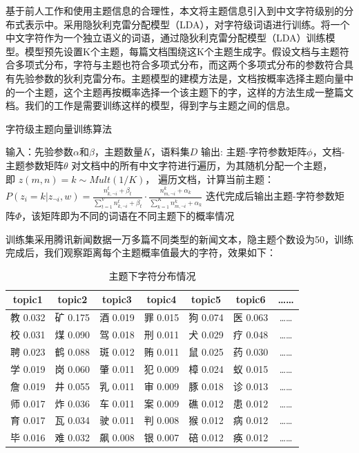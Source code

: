 \documentclass[winfonts,master,oneside,nobackinfo]{njuthesis}
\begin{document}
基于前人工作和使用主题信息的合理性，本文将主题信息引入到中文字符级别的分布式表示中。采用隐狄利克雷分配模型（LDA），对字符级词语进行训练。将一个中文字符作为一个独立语义的词语，通过隐狄利克雷分配模型（LDA）训练模型。模型预先设置K个主题，每篇文档围绕这K个主题生成字。假设文档与主题符合多项式分布，字符与主题也符合多项式分布，而这两个多项式分布的参数符合具有先验参数的狄利克雷分布。主题模型的建模方法是，文档按概率选择主题向量中的一个主题，这个主题再按概率选择一个该主题下的字，这样的方法生成一整篇文档。我们的工作是需要训练这样的模型，得到字与主题之间的信息。


\begin{algorithm}[H]
    \caption{字符级主题向量训练算法}
    \label{alg1}
    \begin{algorithmic}[1]
        \STATE 输入：先验参数$\alpha$和$\beta$，主题数量$K$，语料集$D$
        \STATE 输出: 主题-字符参数矩阵$\phi$，文档-主题参数矩阵$\theta$
        \STATE 对文档中的所有中文字符进行遍历，为其随机分配一个主题，\\即 $z(m,n)=k \sim Mult(1/K )$，  
        \STATE 遍历文档，计算当前主题：\\
        $P(z_i=k|z_{\neg i}, w) = \frac {n_{k, \neg i}^t + \beta_t} { \sum_{t=1}^{V} n_{k,\neg i}^t + \beta_t} \cdot \frac {n_{m,\neg i}^k + \alpha_k} {\sum_{k=1}^{K} n_{m, \neg i}^k + \alpha_k }$
        \STATE 迭代完成后输出主题-字符参数矩阵$\Phi$，该矩阵即为不同的词语在不同主题下的概率情况
    \end{algorithmic}
\end{algorithm}

训练集采用腾讯新闻数据一万多篇不同类型的新闻文本，隐主题个数设为50，训练完成后，我们观察距离每个主题概率值最大的字符，效果如下：

\begin{table}[H]
\centering
\begin{tabular}{ccccccc} %
\hline 
topic1& topic2& topic3& topic4& topic5& topic6&……\\
\hline  
教 0.032& 矿 0.175& 酒 0.019& 罪 0.015&狗 0.074&医 0.063&……\\
校 0.031& 煤 0.090& 驾 0.018& 刑 0.011&犬 0.029&疗 0.048&……\\
聘 0.023& 鹤 0.088& 斑 0.012& 贿 0.011&鼠 0.025&药 0.030&……\\
学 0.019& 岗 0.060& 肇 0.011& 犯 0.009&樟 0.024&蚁 0.015&……\\
詹 0.019& 井 0.055& 乳 0.011& 审 0.009&豚 0.018&诊 0.013&……\\
师 0.017& 炸 0.036& 车 0.011& 案 0.009&礁 0.012&患 0.012&……\\
育 0.017& 瓦 0.034& 驶 0.011& 判 0.008&猴 0.012&病 0.012&……\\
毕 0.016& 难 0.032& 飙 0.008& 银 0.007&碚 0.012&痪 0.012&……\\
\hline 
\end{tabular}
\caption{主题下字符分布情况}
\end{table}
\end{document}
